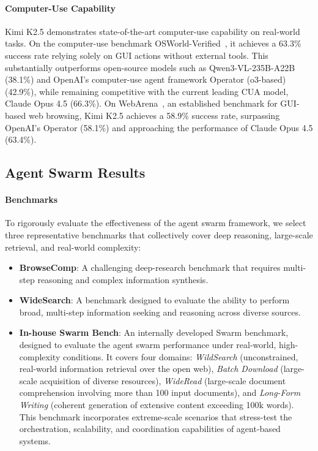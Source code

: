 \documentclass{article}
\newcommand{\citep}[1]{\parencite{#1}}
\begin{document}
\paragraph{Computer-Use Capability} Kimi K2.5 demonstrates state-of-the-art computer-use capability on real-world tasks. On the computer-use benchmark OSWorld-Verified~\citep{osworld_verified,OSWorld}, it achieves a 63.3\% success rate relying solely on GUI actions without external tools. This substantially outperforms open-source models such as Qwen3-VL-235B-A22B (38.1\%) and OpenAI’s computer-use agent framework Operator (o3-based) (42.9\%), while remaining competitive with the current leading CUA model, Claude Opus 4.5 (66.3\%). On WebArena~\citep{zhou2023webarena}, an established benchmark for GUI-based web browsing, Kimi K2.5 achieves a 58.9\% success rate, surpassing OpenAI's Operator (58.1\%) and approaching the performance of Claude Opus 4.5 (63.4\%).
\subsection{Agent Swarm Results}
\label{sec:agent_swarm_results}

\paragraph{Benchmarks}
To rigorously evaluate the effectiveness of the agent swarm framework, we select three representative benchmarks that collectively cover deep reasoning, large-scale retrieval, and real-world complexity:

\begin{itemize}
\item \textbf{BrowseComp}: A challenging deep-research benchmark that requires multi-step reasoning and complex information synthesis.

\item \textbf{WideSearch}: A benchmark designed to evaluate the ability to perform broad, multi-step information seeking and reasoning across diverse sources.

\item \textbf{In-house Swarm Bench}: An internally developed Swarm benchmark, designed to evaluate the agent swarm performance under real-world, high-complexity conditions. It covers four domains: \textit{WildSearch} (unconstrained, real-world information retrieval over the open web), \textit{Batch Download} (large-scale acquisition of diverse resources), \textit{WideRead} (large-scale document comprehension involving more than 100 input documents), and \textit{Long-Form Writing} (coherent generation of extensive content exceeding 100k words). This benchmark incorporates extreme-scale scenarios that stress-test the orchestration, scalability, and coordination capabilities of agent-based systems.
\end{itemize}
\end{document}
